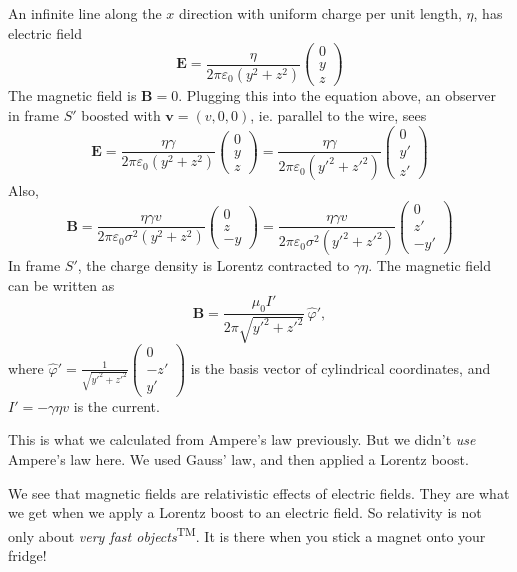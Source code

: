 \documentclass[a4paper]{article}
\begin{document}
\begin{eg}
  An infinite line along the $x$ direction with uniform charge per unit length, $\eta$, has electric field
  \[
    \mathbf{E} = \frac{\eta}{2\pi \varepsilon_0 (y^2 + z^2)}
    \begin{pmatrix}
      0\\ y\\ z
    \end{pmatrix}
  \]
  The magnetic field is $\mathbf{B} = 0$. Plugging this into the equation above, an observer in frame $S'$ boosted with $\mathbf{v} = (v, 0, 0)$, ie. parallel to the wire, sees
  \[
    \mathbf{E} = \frac{\eta\gamma}{2\pi\varepsilon_0(y^2 + z^2)}
    \begin{pmatrix}
      0\\y\\z
    \end{pmatrix} =
    \frac{\eta\gamma}{2\pi\varepsilon_0(y'^2 + z'^2)}
    \begin{pmatrix}
      0\\y'\\z'
    \end{pmatrix}
  \]
  Also,
  \[
    \mathbf{B} = \frac{\eta\gamma v}{2\pi\varepsilon_0 \sigma^2(y^2 + z^2)}
    \begin{pmatrix}
      0\\z\\-y
    \end{pmatrix} = \frac{\eta\gamma v}{2\pi\varepsilon_0 \sigma^2(y'^2 + z'^2)}
    \begin{pmatrix}
      0\\z'\\-y'
    \end{pmatrix}
  \]
  In frame $S'$, the charge density is Lorentz contracted to $\gamma\eta$. The magnetic field can be written as
  \[
    \mathbf{B} = \frac{\mu_0 I'}{2\pi \sqrt{y'^2 + z'^2}}\, \hat{\varphi}',
  \]
  where $\displaystyle \hat{\varphi}' = \frac{1}{\sqrt{y'^2 + z'^2}} \begin{pmatrix}0\\-z'\\y'\end{pmatrix}$ is the basis vector of cylindrical coordinates, and $I' = -\gamma\eta v$ is the current.

  This is what we calculated from Ampere's law previously. But we didn't \emph{use} Ampere's law here. We used Gauss' law, and then applied a Lorentz boost.
\end{eg}
We see that magnetic fields are relativistic effects of electric fields. They are what we get when we apply a Lorentz boost to an electric field. So relativity is not only about \emph{very fast objects}\textsuperscript{TM}. It is there when you stick a magnet onto your fridge!
\end{document}
